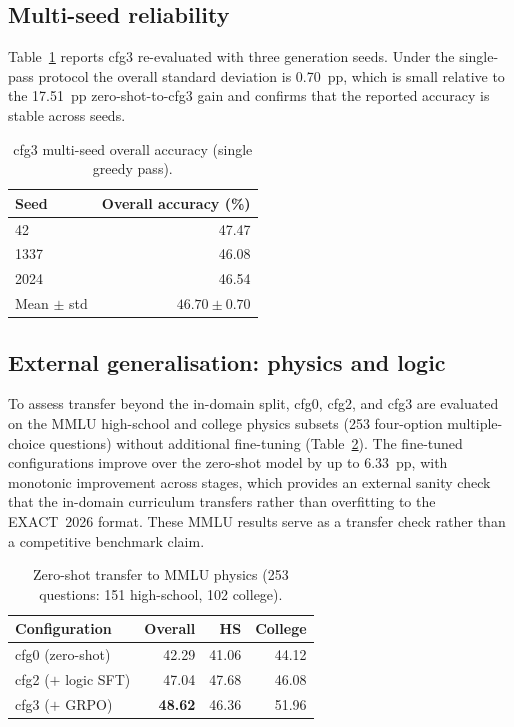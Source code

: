 \documentclass[APA,twocolumn]{USG}
\newcommand{\dataset}{EXACT~2026}
\begin{document}
\subsection{Multi-seed reliability}
Table~\ref{tab5} reports cfg3 re-evaluated with three generation seeds. Under the
single-pass protocol the overall standard deviation is 0.70~pp, which is small
relative to the 17.51~pp zero-shot-to-cfg3 gain and confirms that the reported
accuracy is stable across seeds.

\begin{table}[t]
\centering
\caption{cfg3 multi-seed overall accuracy (single greedy pass).\label{tab5}}
\begin{tabular*}{\columnwidth}{@{\extracolsep\fill}lr@{\extracolsep\fill}}
\toprule
\textbf{Seed} & \textbf{Overall accuracy (\%)} \\
\midrule
42 & 47.47 \\
1337 & 46.08 \\
2024 & 46.54 \\
\midrule
Mean $\pm$ std & $46.70 \pm 0.70$ \\
\bottomrule
\end{tabular*}
\end{table}

\subsection{External generalisation: physics and logic}
To assess transfer beyond the in-domain split, cfg0, cfg2, and cfg3 are evaluated
on the MMLU \citep{Hendrycks2021} high-school and college physics subsets (253
four-option multiple-choice questions) without additional fine-tuning
(Table~\ref{tab6}). The fine-tuned configurations improve over the zero-shot
model by up to 6.33~pp, with monotonic improvement across stages, which provides
an external sanity check that the in-domain curriculum transfers rather than
overfitting to the \dataset{} format. These MMLU results serve as a transfer
check rather than a competitive benchmark claim.

\begin{table}[t]
\centering
\caption{Zero-shot transfer to MMLU physics (253 questions: 151 high-school, 102
college).\label{tab6}}
\begin{tabular*}{\columnwidth}{@{\extracolsep\fill}lrrr@{\extracolsep\fill}}
\toprule
\textbf{Configuration} & \textbf{Overall} & \textbf{HS} & \textbf{College} \\
\midrule
cfg0 (zero-shot) & 42.29 & 41.06 & 44.12 \\
cfg2 ($+$ logic SFT) & 47.04 & 47.68 & 46.08 \\
cfg3 ($+$ GRPO) & \textbf{48.62} & 46.36 & 51.96 \\
\bottomrule
\end{tabular*}
\end{table}
\end{document}
